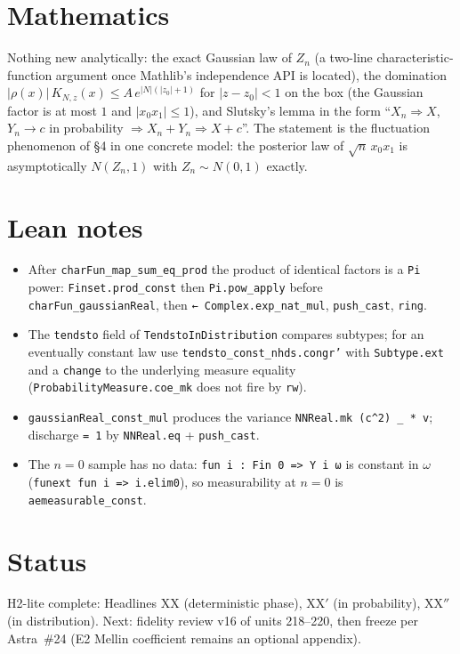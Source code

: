 \documentclass[11pt]{article}
\begin{document}
\section{Mathematics}
Nothing new analytically: the exact Gaussian law of $Z_n$ (a two-line characteristic-function argument
once Mathlib's independence API is located), the domination $|\rho(x)|\,K_{N,z}(x)\le A\,e^{|N|(|z_0|+1)}$
for $|z-z_0|<1$ on the box (the Gaussian factor is at most $1$ and $|x_0x_1|\le1$), and Slutsky's lemma
in the form ``$X_n\Rightarrow X$, $Y_n\to c$ in probability $\Rightarrow X_n+Y_n\Rightarrow X+c$''. The
statement is the fluctuation phenomenon of \S4 in one concrete model: the posterior law of
$\sqrt n\,x_0x_1$ is asymptotically $N(Z_n,1)$ with $Z_n\sim N(0,1)$ exactly.

\section{Lean notes}
\begin{itemize}
\item After \texttt{charFun\_map\_sum\_eq\_prod} the product of identical factors is a \texttt{Pi} power:
  \texttt{Finset.prod\_const} then \texttt{Pi.pow\_apply} before \texttt{charFun\_gaussianReal}, then
  \texttt{← Complex.exp\_nat\_mul}, \texttt{push\_cast}, \texttt{ring}.
\item The \texttt{tendsto} field of \texttt{TendstoInDistribution} compares subtypes; for an eventually
  constant law use \texttt{tendsto\_const\_nhds.congr'} with \texttt{Subtype.ext} and a \texttt{change} to the
  underlying measure equality (\texttt{ProbabilityMeasure.coe\_mk} does not fire by \texttt{rw}).
\item \texttt{gaussianReal\_const\_mul} produces the variance \texttt{NNReal.mk (c\^{}2) \_ * v}; discharge
  \texttt{= 1} by \texttt{NNReal.eq} + \texttt{push\_cast}.
\item The $n=0$ sample has no data: \texttt{fun i : Fin 0 => Y i ω} is constant in $\omega$
  (\texttt{funext fun i => i.elim0}), so measurability at $n=0$ is \texttt{aemeasurable\_const}.
\end{itemize}

\section{Status}
H2-lite complete: Headlines XX (deterministic phase), XX$'$ (in probability), XX$''$ (in distribution).
Next: fidelity review v16 of units 218--220, then freeze per Astra~\#24 (E2 Mellin coefficient remains an
optional appendix).
\end{document}
